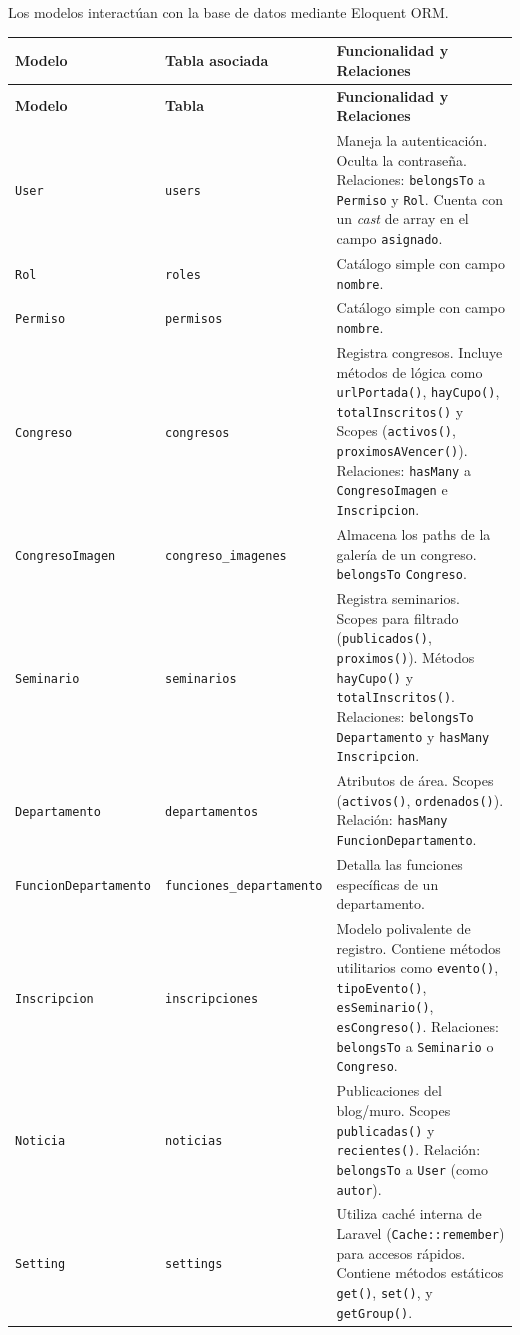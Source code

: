 \documentclass{article}
\begin{document}
Los modelos interactúan con la base de datos mediante Eloquent ORM.

\begin{longtable}{>{\raggedright\arraybackslash}p{3cm} >{\raggedright\arraybackslash}p{3cm} >{\raggedright\arraybackslash}p{9cm}}
\toprule
\textbf{Modelo} & \textbf{Tabla asociada} & \textbf{Funcionalidad y Relaciones} \\
\midrule
\endfirsthead
\toprule
\textbf{Modelo} & \textbf{Tabla} & \textbf{Funcionalidad y Relaciones} \\
\midrule
\endhead
\bottomrule
\endfoot
\bottomrule
\endlastfoot
\texttt{User} & \texttt{users} & Maneja la autenticación. Oculta la contraseña. Relaciones: \texttt{belongsTo} a \texttt{Permiso} y \texttt{Rol}. Cuenta con un \textit{cast} de array en el campo \texttt{asignado}. \\
\texttt{Rol} & \texttt{roles} & Catálogo simple con campo \texttt{nombre}. \\
\texttt{Permiso} & \texttt{permisos} & Catálogo simple con campo \texttt{nombre}. \\
\texttt{Congreso} & \texttt{congresos} & Registra congresos. Incluye métodos de lógica como \texttt{urlPortada()}, \texttt{hayCupo()}, \texttt{totalInscritos()} y Scopes (\texttt{activos()}, \texttt{proximosAVencer()}). Relaciones: \texttt{hasMany} a \texttt{CongresoImagen} e \texttt{Inscripcion}. \\
\texttt{CongresoImagen} & \texttt{congreso\_imagenes} & Almacena los paths de la galería de un congreso. \texttt{belongsTo} \texttt{Congreso}. \\
\texttt{Seminario} & \texttt{seminarios} & Registra seminarios. Scopes para filtrado (\texttt{publicados()}, \texttt{proximos()}). Métodos \texttt{hayCupo()} y \texttt{totalInscritos()}. Relaciones: \texttt{belongsTo} \texttt{Departamento} y \texttt{hasMany} \texttt{Inscripcion}. \\
\texttt{Departamento} & \texttt{departamentos} & Atributos de área. Scopes (\texttt{activos()}, \texttt{ordenados()}). Relación: \texttt{hasMany} \texttt{FuncionDepartamento}. \\
\texttt{FuncionDepartamento} & \texttt{funciones\_departamento} & Detalla las funciones específicas de un departamento. \\
\texttt{Inscripcion} & \texttt{inscripciones} & Modelo polivalente de registro. Contiene métodos utilitarios como \texttt{evento()}, \texttt{tipoEvento()}, \texttt{esSeminario()}, \texttt{esCongreso()}. Relaciones: \texttt{belongsTo} a \texttt{Seminario} o \texttt{Congreso}. \\
\texttt{Noticia} & \texttt{noticias} & Publicaciones del blog/muro. Scopes \texttt{publicadas()} y \texttt{recientes()}. Relación: \texttt{belongsTo} a \texttt{User} (como \texttt{autor}). \\
\texttt{Setting} & \texttt{settings} & Utiliza caché interna de Laravel (\texttt{Cache::remember}) para accesos rápidos. Contiene métodos estáticos \texttt{get()}, \texttt{set()}, y \texttt{getGroup()}. \\
\end{longtable}
\end{document}

